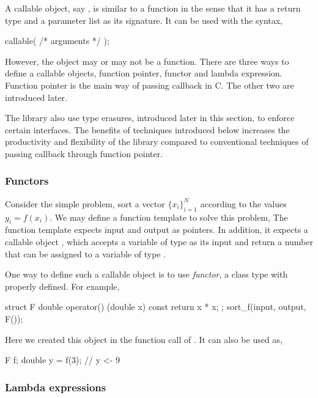 A callable object, say , is similar to a function in the sense that it has a return type and a parameter list as its signature. It can be used with the syntax,
\begin{cppcode}
callable( /* arguments */ );
\end{cppcode}
However, the object may or may not be a function. There are three ways to define a callable objects, function pointer, functor and \cppoo lambda expression. Function pointer is the main way of passing callback in C. The other two are introduced later.

The library also use type erasures, introduced later in this section, to enforce certain interfaces. The benefits of techniques introduced below increases the productivity and flexibility of the library compared to conventional techniques of passing callback through function pointer.

\subsubsection{Functors}
\label{ssub:Functors}

Consider the simple problem, sort a vector $\{x_i\}_{i=1}^N$ according to the values $y_i = f(x_i)$. We may define a function template to solve this problem,
The function template  expects input and output as pointers. In addition, it expects a callable object , which accepts a variable of type  as its input and return a number that can be assigned to a variable of type .

One way to define such a callable object is to use \emph{functor}, a class type with  properly defined. For example,
\begin{cppcode}
struct F
{
    double operator() (double x) const { return x * x; }
};
sort_f(input, output, F());
\end{cppcode}
Here we created this object in the function call of . It can also be used as,
\begin{cppcode}
F f;
double y = f(3); // y <- 9
\end{cppcode}

\subsubsection{Lambda expressions}
\label{ssub:Lambda expressions}

